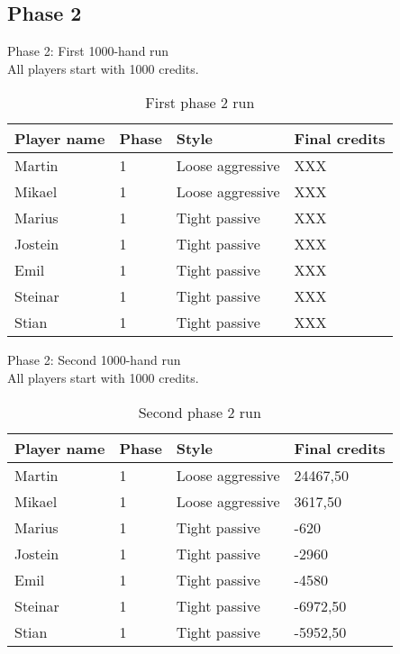 \documentclass[a4paper, 12pt]{article}
\begin{document}
\subsection{Phase 2}
\begin{center}
	{ \Large Phase 2: First 1000-hand run } \\
	All players start with 1000 credits.
\end{center}

\begin{table}[H]
	\begin{center}
		\begin{tabular}{|l|l|l| p{6cm} |}
		\hline
		\textbf{Player name} & \textbf{Phase} & \textbf{Style} & \textbf{Final credits} \\
		\hline
		Martin & 1 & Loose aggressive & XXX \\
		\hline
		Mikael & 1 & Loose aggressive & XXX \\
		\hline
		Marius & 1 & Tight passive & XXX \\
		\hline
		Jostein & 1 & Tight passive & XXX \\
		\hline
		Emil & 1 & Tight passive & XXX \\
		\hline
		Steinar & 1 & Tight passive & XXX \\
		\hline
		Stian & 1 & Tight passive & XXX \\
		\hline
		\end{tabular}
	\end{center}
	\caption{First phase 2 run}
\end{table}

\begin{center}
	{ \Large Phase 2: Second 1000-hand run } \\
	All players start with 1000 credits.
\end{center}

\begin{table}[H]
	\begin{center}
		\begin{tabular}{|l|l|l| p{6cm} |}
		\hline
		\textbf{Player name} & \textbf{Phase} & \textbf{Style} & \textbf{Final credits} \\
		\hline
		Martin & 1 & Loose aggressive & 24467,50 \\
		\hline
		Mikael & 1 & Loose aggressive & 3617,50 \\
		\hline
		Marius & 1 & Tight passive & -620 \\
		\hline
		Jostein & 1 & Tight passive & -2960 \\
		\hline
		Emil & 1 & Tight passive & -4580 \\
		\hline
		Steinar & 1 & Tight passive & -6972,50 \\
		\hline
		Stian & 1 & Tight passive & -5952,50 \\
		\hline
		\end{tabular}
	\end{center}
	\caption{Second phase 2 run}
\end{table}
\end{document}

